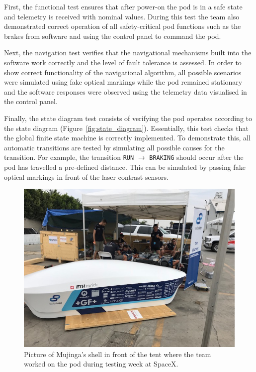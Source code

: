First, the functional test ensures that after power-on the pod is in a safe state and telemetry is received with nominal values. During this test the team also demonstrated correct operation of all safety-critical pod functions such as the brakes from software and using the control panel to command the pod.

Next, the navigation test verifies that the navigational mechanisms built into the software work correctly and the level of fault tolerance is assessed. In order to show correct functionality of the navigational algorithm, all possible scenarios were simulated using fake optical markings while the pod remained stationary and the software responses were observed using the telemetry data visualised in the control panel.

Finally, the state diagram test consists of verifying the pod operates according to the state diagram (Figure~\ref{fig:state_diagram}). Essentially, this test checks that the global finite state machine is correctly implemented. To demonstrate this, all automatic transitions are tested by simulating all possible causes for the transition. For example, the transition \texttt{RUN} $\rightarrow$ \texttt{BRAKING} should occur after the pod has travelled a pre-defined distance. This can be simulated by passing fake optical markings in front of the laser contrast sensors.

\begin{figure}[H]
  \centering \includegraphics[width=1.0\textwidth]{./figures/mujinga_competition_tent}
  \caption{Picture of Mujinga's shell in front of the tent where the team worked on the pod during testing week at SpaceX.}
\end{figure}


